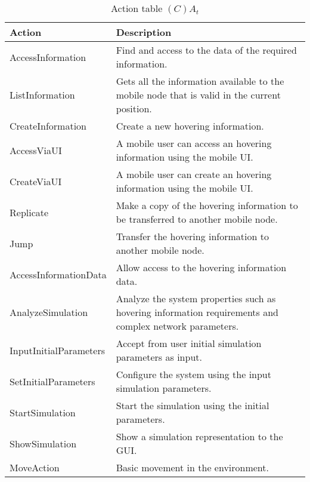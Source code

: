 \begin{table}[H]
	\centering
	\begin{tabular}{|p{4cm}|p{8cm}|}
			\hline
			\textbf{Action} & \textbf{Description} \\
			\hline
			AccessInformation & Find and access to the data of the required
			information. \\
			\hline
			ListInformation & Gets all the information available to the mobile node
			that is valid in the current position.\\
			\hline
			CreateInformation & Create a new hovering information. \\
			\hline
			AccessViaUI & A mobile user can access an hovering information using the
			mobile UI. \\
			\hline
			CreateViaUI & A mobile user can create an hovering information using the
			mobile UI. \\
			\hline
			Replicate & Make a copy of the hovering information to be transferred to
			another mobile node. \\
			\hline
			Jump & Transfer the hovering information to another mobile node. \\
			\hline
			AccessInformationData & Allow access to the hovering information data. \\
			\hline
			AnalyzeSimulation & Analyze the system properties such as hovering
			information requirements and complex network parameters. \\
			\hline
			InputInitialParameters & Accept from user initial simulation parameters
			as input. \\
			\hline
			SetInitialParameters & Configure the system using the input simulation
			parameters. \\
			\hline
			StartSimulation & Start the simulation using the initial parameters. \\
			\hline
			ShowSimulation & Show a simulation representation to the GUI. \\
			\hline
			MoveAction & Basic movement in the environment. \\
			\hline
		\end{tabular}
	\caption{Action table $(C)A_t$}
	\label{tab:cat}
\end{table}

